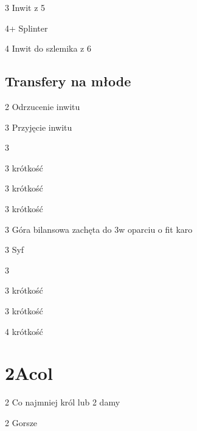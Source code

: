 \documentclass[12pt, a4paper]{article}
\begin{document}
\begin{options}[2]
    \item[3\hearts] Inwit z 5\hearts
    \item[4\clubs+] Splinter 
    \item[4\spades] Inwit do szlemika z 6  
\end{options}

\subsection*{Transfery na młode}

\begin{options}[1]
    \item[2\nt] Odrzucenie inwitu
    \item[3\clubs] Przyjęcie inwitu  
\end{options}

\begin{options}[2]
    \item[3\clubs] \soff
    \item[3\diams] krótkość
    \item[3\hearts] krótkość
    \item[3\spades] krótkość   
\end{options}


\begin{options}[1]
    \item[3\clubs] Góra bilansowa \orr zachęta do 3\nt w oparciu o fit karo
    \item[3\diams] Syf 
\end{options}

\begin{options}[2]
    \item[3\diams] \soff
    \item[3\hearts] krótkość
    \item[3\spades] krótkość   
    \item[4\clubs] krótkość 
\end{options}


\pagebreak
\section*{2\clubs Acol}

\sequence{{2\clubs}}
\begin{options}[2]
    \item[2\diams] Co najmniej król lub 2 damy \gf
    \item[2\hearts] Gorsze
\end{options}
\end{document}
